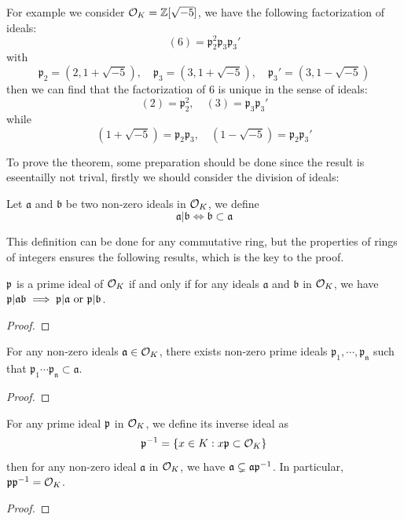For example we consider \(\mathcal{O}_K = \mathbb{Z}[\sqrt{-5}]\), we have the following factorization of ideals:
\[(6) = \mathfrak{p}_2^2 \mathfrak{p}_3 \mathfrak{p}_3'\]
with \[\mathfrak{p_2} = (2,1+\sqrt{-5}),\quad \mathfrak{p_3} = (3,1+\sqrt{-5}),\quad \mathfrak{p_3'} = (3,1-\sqrt{-5})\]
then we can find that the factorization of \(6\) is unique in the sense of ideals:
\[(2) = \mathfrak{p}_2^2 , \quad (3) = \mathfrak{p}_3 \mathfrak{p}_3'\]
while
\[(1+\sqrt{-5}) = \mathfrak{p}_2 \mathfrak{p}_3 ,\quad (1-\sqrt{-5}) = \mathfrak{p}_2 \mathfrak{p}_3'\]

To prove the theorem, some preparation should be done since the result is eseentailly not trival, firstly we should consider the division of ideals:

\begin{definition}
    Let \(\mathfrak{a}\) and \(\mathfrak{b}\) be two non-zero ideals in \(\mathcal{O}_K\), we define 
    \[\mathfrak{a} | \mathfrak{b} \iff \mathfrak{b} \subset \mathfrak{a}\]
\end{definition}

This definition can be done for any commutative ring, but the properties of rings of integers ensures the following results, which is the key to the proof.

\begin{lemma}
    \(\mathfrak{p}\) is a prime ideal of \(\mathcal{O}_K\) if and only if for any ideals \(\mathfrak{a}\) and \(\mathfrak{b}\) in \(\mathcal{O}_K\), we have \(\mathfrak{p} | \mathfrak{a}\mathfrak{b} \implies \mathfrak{p} | \mathfrak{a} \text{ or } \mathfrak{p} | \mathfrak{b}\).
\end{lemma}
\begin{proof}
    
\end{proof}

\begin{lemma}
    For any non-zero ideals \(\mathfrak{a} \in \mathcal{O}_K\), there exists non-zero prime ideals \(\mathfrak{p_1},\cdots,\mathfrak{p_n}\) such that \( \mathfrak{p_1}\cdots\mathfrak{p_n} \subset \mathfrak{a}\). 
\end{lemma}

\begin{proof}
    
\end{proof}

\begin{lemma} \label{lemma2forfract}
    For any prime ideal \(\mathfrak{p}\) in \(\mathcal{O}_K\), we define its inverse ideal as \[\mathfrak{p}^{-1} = \{x \in K : x\mathfrak{p} \subset \mathcal{O}_K\}\]
then for any non-zero ideal \(\mathfrak{a}\) in \(\mathcal{O}_K\), we have \(\mathfrak{a}\subsetneq \mathfrak{a}\mathfrak{p}^{-1} \). In particular, \(\mathfrak{p}\mathfrak{p}^{-1} = \mathcal{O}_K\).
\end{lemma}
\begin{proof}
    
\end{proof}

